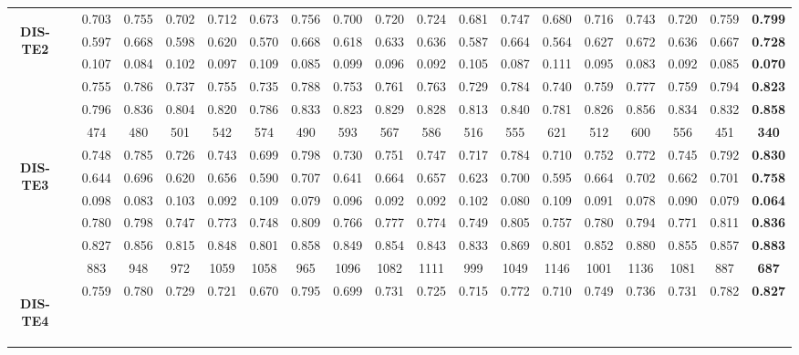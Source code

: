 \documentclass[10pt,twocolumn,letterpaper]{article}
\begin{document}
\begin{table*}[t!]
{\begin{tabular}{c|r|cccccc|cc|ccc|ccccc|c}
	\hline 
\multirow{6}{*}{\begin{sideways}\textbf{DIS-TE2}\end{sideways}}	&		&	0.703	&	0.755	&	0.702	&	0.712	&	0.673	&	0.756	&	0.700	&	0.720	&	0.724	&	0.681	&	0.747	&	0.680	&	0.716	&	0.743	&	0.720	&	0.759	&	\textbf{0.799}	\\
	&		&	0.597	&	0.668	&	0.598	&	0.620	&	0.570	&	0.668	&	0.618	&	0.633	&	0.636	&	0.587	&	0.664	&	0.564	&	0.627	&	0.672	&	0.636	&	0.667	&	\textbf{0.728}	\\
	&		&	0.107	&	0.084	&	0.102	&	0.097	&	0.109	&	0.085	&	0.099	&	0.096	&	0.092	&	0.105	&	0.087	&	0.111	&	0.095	&	0.083	&	0.092	&	0.085	&	\textbf{0.070}	\\
	&		&	0.755	&	0.786	&	0.737	&	0.755	&	0.735	&	0.788	&	0.753	&	0.761	&	0.763	&	0.729	&	0.784	&	0.740	&	0.759	&	0.777	&	0.759	&	0.794	&	\textbf{0.823}	\\
	&		&	0.796	&	0.836	&	0.804	&	0.820	&	0.786	&	0.833	&	0.823	&	0.829	&	0.828	&	0.813	&	0.840	&	0.781	&	0.826	&	0.856	&	0.834	&	0.832	&	\textbf{0.858}	\\
    &		&	474	&	480	&	501	&	542	&	574	&	490	&	593	&	567	&	586	&	516	&	555	&	621	&	512	&	600	&	556	&	451	&	\textbf{340}	\\
    \hline 
\multirow{6}{*}{\begin{sideways}\textbf{DIS-TE3}\end{sideways}}	&		&	0.748	&	0.785	&	0.726	&	0.743	&	0.699	&	0.798	&	0.730	&	0.751	&	0.747	&	0.717	&	0.784	&	0.710	&	0.752	&	0.772	&	0.745	&	0.792	&	\textbf{0.830}	\\
	&		&	0.644	&	0.696	&	0.620	&	0.656	&	0.590	&	0.707	&	0.641	&	0.664	&	0.657	&	0.623	&	0.700	&	0.595	&	0.664	&	0.702	&	0.662	&	0.701	&	\textbf{0.758}	\\
	&		&	0.098	&	0.083	&	0.103	&	0.092	&	0.109	&	0.079	&	0.096	&	0.092	&	0.092	&	0.102	&	0.080	&	0.109	&	0.091	&	0.078	&	0.090	&	0.079	&	\textbf{0.064}	\\
	&		&	0.780	&	0.798	&	0.747	&	0.773	&	0.748	&	0.809	&	0.766	&	0.777	&	0.774	&	0.749	&	0.805	&	0.757	&	0.780	&	0.794	&	0.771	&	0.811	&	\textbf{0.836}	\\
	&		&	0.827	&	0.856	&	0.815	&	0.848	&	0.801	&	0.858	&	0.849	&	0.854	&	0.843	&	0.833	&	0.869	&	0.801	&	0.852	&	0.880	&	0.855	&	0.857	&	\textbf{0.883}	\\
	&		&	883	&	948	&	972	&	1059	&	1058	&	965	&	1096	&	1082	&	1111	&	999	&	1049	&	1146	&	1001	&	1136	&	1081	&	887	&	\textbf{687}	\\
	\hline 
\multirow{6}{*}{\begin{sideways}\textbf{DIS-TE4}\end{sideways}}	&		&	0.759	&	0.780	&	0.729	&	0.721	&	0.670	&	0.795	&	0.699	&	0.731	&	0.725	&	0.715	&	0.772	&	0.710	&	0.749	&	0.736	&	0.731	&	0.782	&	\textbf{0.827}	\\

\end{tabular}}
\end{table*}
\end{document}

